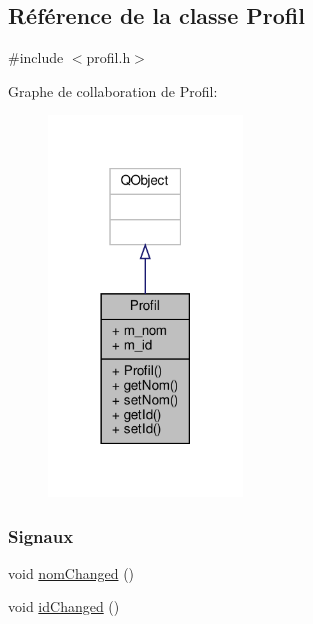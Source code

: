 \hypertarget{class_profil}{}\subsection{Référence de la classe Profil}
\label{class_profil}


{\ttfamily \#include $<$profil.\+h$>$}



Graphe de collaboration de Profil\+:\nopagebreak
\begin{figure}[H]
\begin{center}
\leavevmode
\includegraphics[width=146pt]{class_profil__coll__graph}
\end{center}
\end{figure}
\subsubsection*{Signaux}
\begin{DoxyCompactItemize}
\item 
void \hyperlink{class_profil_aa55e5770c76e28ab12296e675cc939fe}{nom\+Changed} ()
\item 
void \hyperlink{class_profil_a0d67f046b27cfa936590d72a3fef82aa}{id\+Changed} ()
\end{DoxyCompactItemize}
